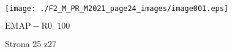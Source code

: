 \documentclass[a4paper,12pt]{article}
\begin{document}
\begin{center}
\texttt{[image: ./F2\_M\_PR\_M2021\_page24\_images/image001.eps]}
\end{center}
$\mathrm{E}\mathrm{M}\mathrm{A}\mathrm{P}-\mathrm{R}0_{-}100$

Strona 25 z27
\end{document}
